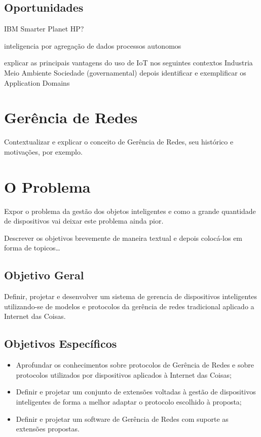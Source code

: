 \documentclass[twoside,english,brazilian]{UNISINOSmonografia}
\begin{document}
\subsection{Oportunidades}

IBM Smarter Planet
HP?

inteligencia por agregação de dados
processos autonomos

explicar as principais vantagens do uso de IoT nos seguintes contextos
Industria
Meio Ambiente
Sociedade (governamental)
depois identificar e exemplificar os Application Domains \cite{Sundmaeker2010}


	\section{Gerência de Redes}
	
		Contextualizar e explicar o conceito de Gerência de Redes, seu 
		histórico
		e motivações, por exemplo.


\section{O Problema}

	Expor o problema da gestão dos objetos inteligentes e como a grande 
	quantidade
	de dispositivos vai deixar este problema ainda pior.
		
	Descrever os objetivos brevemente de maneira textual e depois colocá-los em
	forma de topicos\ldots


	\subsection{Objetivo Geral}
	
		Definir, projetar e desenvolver um sistema de gerencia de dispositivos 
		inteligentes utilizando-se de modelos e protocolos da gerência de 
		redes tradicional aplicado a Internet das Coisas.
	
	
	\subsection{Objetivos Específicos}
	
		\begin{itemize}
			\item 
				Aprofundar os conhecimentos sobre protocolos de Gerência de 
				Redes e sobre protocolos utilizados por dispositivos aplicados 
				à Internet das Coisas;
				
			\item
				Definir e projetar um conjunto de extensões voltadas à gestão 
				de dispositivos inteligentes de forma a melhor adaptar o 
				protocolo escolhido à proposta;
				
			\item
				Definir e projetar um software de Gerência de Redes com 
				suporte as extensões propostas.
				
		\end{itemize}
\end{document}
